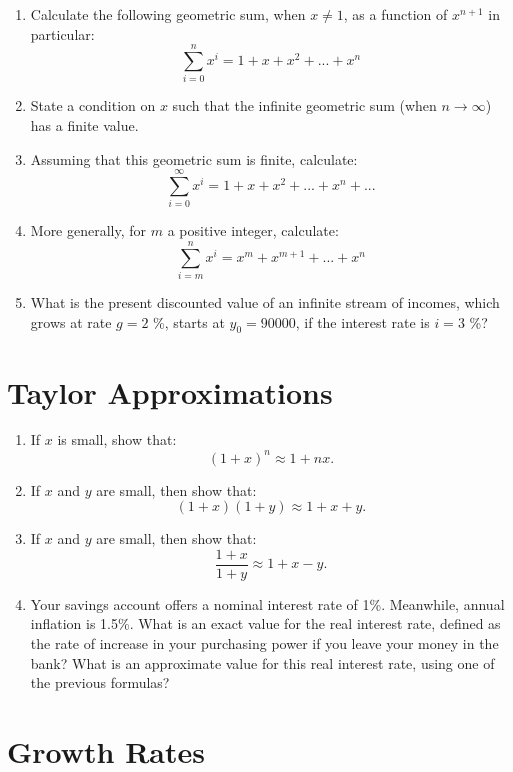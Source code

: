 \documentclass[]{book}
\theoremstyle{definition}
\theoremstyle{definition}
\theoremstyle{definition}
\theoremstyle{remark}
\begin{document}
\begin{enumerate}
\def\labelenumi{\arabic{enumi}.}
\item
  Calculate the following geometric sum, when \(x \neq 1\), as a
  function of \(x^{n+1}\) in particular:
  \[\sum_{i=0}^n x^i = 1+x+x^2+...+x^n\]
\item
  State a condition on \(x\) such that the infinite geometric sum (when
  \(n \to \infty\)) has a finite value.
\item
  Assuming that this geometric sum is finite, calculate:
  \[\sum_{i=0}^{\infty} x^i = 1+x+x^2+...+x^n+...\]
\item
  More generally, for \(m\) a positive integer, calculate:
  \[\sum_{i=m}^n x^i = x^m+x^{m+1}+...+x^n\]
\item
  What is the present discounted value of an infinite stream of incomes,
  which grows at rate \(g=2\) \%, starts at \(y_0=90000\), if the
  interest rate is \(i=3\) \%?
\end{enumerate}

\section{Taylor Approximations}\label{taylor-approximations}

\begin{enumerate}
\def\labelenumi{\arabic{enumi}.}
\item
  If \(x\) is small, show that: \[(1+x)^n \approx 1+nx.\]
\item
  If \(x\) and \(y\) are small, then show that:
  \[(1+x)(1+y) \approx 1+x+y.\]
\item
  If \(x\) and \(y\) are small, then show that:
  \[\frac{1+x}{1+y} \approx 1+x-y.\]
\item
  Your savings account offers a nominal interest rate of 1\%. Meanwhile,
  annual inflation is 1.5\%. What is an exact value for the real
  interest rate, defined as the rate of increase in your purchasing
  power if you leave your money in the bank? What is an approximate
  value for this real interest rate, using one of the previous formulas?
\end{enumerate}

\section{Growth Rates}\label{growth-rates}
\end{document}
